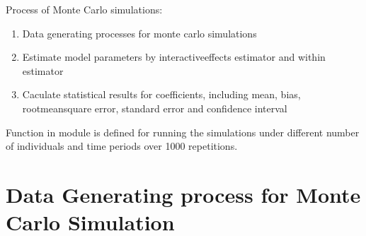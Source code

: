 \documentclass[a4paper,11pt,english]{sphinxmanual}
\begin{document}
\sphinxAtStartPar
Process of Monte Carlo simulations:
\begin{enumerate}
%
\item {} 
\sphinxAtStartPar
Data generating processes for monte carlo simulations

\item {} 
\sphinxAtStartPar
Estimate model parameters by interactive\sphinxhyphen{}effects estimator and within estimator

\item {} 
\sphinxAtStartPar
Caculate statistical results for coefficients, including mean, bias, root\sphinxhyphen{}mean\sphinxhyphen{}square error, standard error and confidence interval

\end{enumerate}

\sphinxAtStartPar
Function  in module  is defined for running the simulations under different number of individuals and time periods over 1000 repetitions.


\section{Data Generating process for Monte Carlo Simulation}
\label{\detokenize{analysis:module-src.analysis.monte_carlo_dgp}}\label{\detokenize{analysis:data-generating-process-for-monte-carlo-simulation}}
\end{document}

